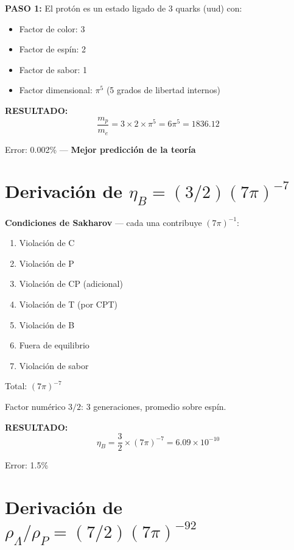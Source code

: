 \textbf{PASO 1:} El protón es un estado ligado de 3 quarks (uud) con:
\begin{itemize}
    \item Factor de color: 3
    \item Factor de espín: 2
    \item Factor de sabor: 1
    \item Factor dimensional: $\pi^5$ (5 grados de libertad internos)
\end{itemize}

\textbf{RESULTADO:}
\begin{equation}
\boxed{\frac{m_p}{m_e} = 3 \times 2 \times \pi^5 = 6\pi^5 = 1836.12}
\end{equation}

Error: 0.002\% --- \textbf{Mejor predicción de la teoría}


\section{Derivación de $\eta_B = (3/2)(7\pi)^{-7}$}

\textbf{Condiciones de Sakharov} --- cada una contribuye $(7\pi)^{-1}$:
\begin{enumerate}
    \item Violación de C
    \item Violación de P
    \item Violación de CP (adicional)
    \item Violación de T (por CPT)
    \item Violación de B
    \item Fuera de equilibrio
    \item Violación de sabor
\end{enumerate}

Total: $(7\pi)^{-7}$

Factor numérico $3/2$: 3 generaciones, promedio sobre espín.

\textbf{RESULTADO:}
\begin{equation}
\boxed{\eta_B = \frac{3}{2} \times (7\pi)^{-7} = 6.09 \times 10^{-10}}
\end{equation}

Error: 1.5\%


\section{Derivación de $\rho_\Lambda/\rho_P = (7/2)(7\pi)^{-92}$}

